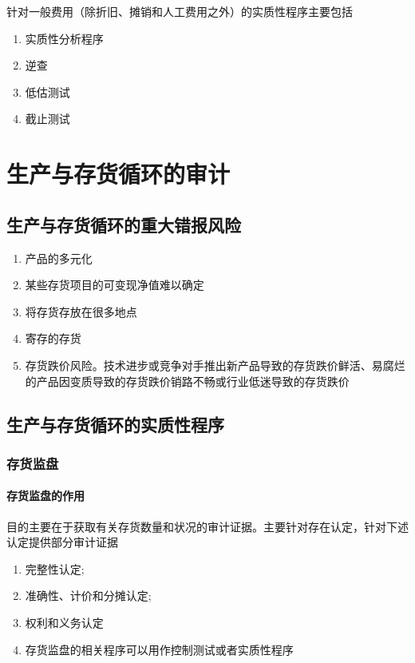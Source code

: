 \documentclass[UTF8,12pt]{ctexart}
\numberwithin{equation}{section} %
\numberwithin{figure}{section}
\numberwithin{table}{section}
\begin{document}
	针对一般费用（除折旧、摊销和人工费用之外）的实质性程序主要包括
	\begin{enumerate}
		\item 实质性分析程序
		
		\item 逆查
		
		\item 低估测试
		
		\item 截止测试
	\end{enumerate}
	
	
	\newpage
	\section{生产与存货循环的审计}
	
	\subsection{生产与存货循环的重大错报风险}
	\begin{enumerate}
		\item 产品的多元化 
		
		\item 某些存货项目的可变现净值难以确定
		
		\item 将存货存放在很多地点 
		
		\item 寄存的存货
		
		\item 存货跌价风险。技术进步或竞争对手推出新产品导致的存货跌价鲜活、易腐烂的产品因变质导致的存货跌价销路不畅或行业低迷导致的存货跌价
	\end{enumerate}
	
	
	\subsection{生产与存货循环的实质性程序}
	\subsubsection{存货监盘}
	\paragraph{存货监盘的作用}
	目的主要在于获取有关存货数量和状况的审计证据。主要针对存在认定，针对下述认定提供部分审计证据
	\begin{enumerate}
		\item 完整性认定;
		
		\item 准确性、计价和分摊认定;
		
		\item 权利和义务认定
		
		\item 存货监盘的相关程序可以用作控制测试或者实质性程序
	\end{enumerate}
	
\end{document}
